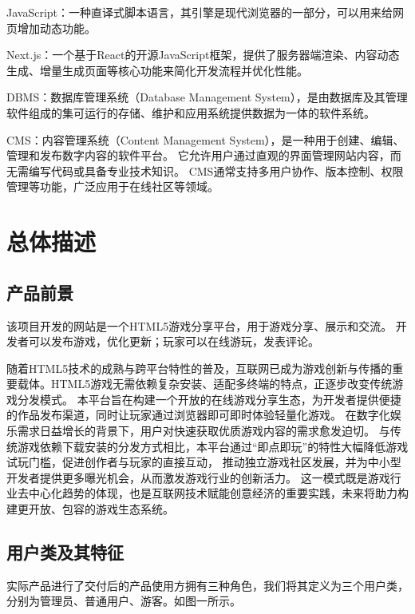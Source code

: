 \documentclass[12pt]{ctexart} %
\begin{document}
JavaScript：一种直译式脚本语言，其引擎是现代浏览器的一部分，可以用来给网页增加动态功能。

Next.js：一个基于React的开源JavaScript框架，提供了服务器端渲染、内容动态生成、增量生成页面等核心功能来简化开发流程并优化性能。

DBMS：数据库管理系统（Database Management System），是由数据库及其管理软件组成的集可运行的存储、维护和应用系统提供数据为一体的软件系统。

CMS：内容管理系统（Content Management System），是一种用于创建、编辑、管理和发布数字内容的软件平台。
它允许用户通过直观的界面管理网站内容，而无需编写代码或具备专业技术知识。
CMS通常支持多用户协作、版本控制、权限管理等功能，广泛应用于在线社区等领域。

\section{总体描述}
\subsection{产品前景}
该项目开发的网站是一个HTML5游戏分享平台，用于游戏分享、展示和交流。
开发者可以发布游戏，优化更新；玩家可以在线游玩，发表评论。

随着HTML5技术的成熟与跨平台特性的普及，互联网已成为游戏创新与传播的重要载体。HTML5游戏无需依赖复杂安装、适配多终端的特点，正逐步改变传统游戏分发模式。
本平台旨在构建一个开放的在线游戏分享生态，为开发者提供便捷的作品发布渠道，同时让玩家通过浏览器即可即时体验轻量化游戏。
在数字化娱乐需求日益增长的背景下，用户对快速获取优质游戏内容的需求愈发迫切。
与传统游戏依赖下载安装的分发方式相比，本平台通过“即点即玩”的特性大幅降低游戏试玩门槛，促进创作者与玩家的直接互动，
推动独立游戏社区发展，并为中小型开发者提供更多曝光机会，从而激发游戏行业的创新活力。
这一模式既是游戏行业去中心化趋势的体现，也是互联网技术赋能创意经济的重要实践，未来将助力构建更开放、包容的游戏生态系统。

\subsection{用户类及其特征}
实际产品进行了交付后的产品使用方拥有三种角色，我们将其定义为三个用户类，分别为管理员、普通用户、游客。如图一所示。
\end{document}
